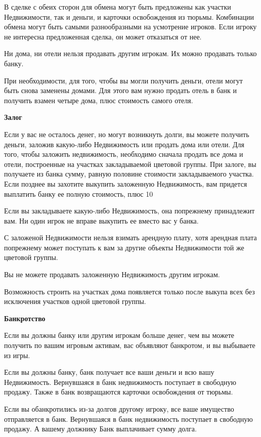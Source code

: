 В сделке с обеих сторон для обмена могут быть предложены как участки Недвижимости, так и деньги, и карточки освобождения из тюрьмы. Комбинации обмена могут быть самыми разнообразными на усмотрение игроков. Если игроку не интересна предложенная сделка, он может отказаться от нее.

Ни дома, ни отели нельзя продавать другим игрокам. Их можно продавать только банку. 

При необходимости, для того, чтобы вы могли получить деньги, отели могут быть снова заменены домами. Для этого вам нужно продать отель в банк и получить взамен четыре дома, плюс стоимость самого отеля.

{\bf Залог}

Если у вас не осталось денег, но могут возникнуть долги, вы можете получить деньги, заложив какую-либо Недвижимость или продать дома или отели. Для того, чтобы заложить недвижимость, необходимо сначала продать все дома и отели, построенные на участках закладываемой цветовой группы. При залоге, вы получаете из банка сумму, равную половине стоимости закладываемого участка. Если позднее вы захотите выкупить заложенную Недвижимость, вам придется выплатить банку ее полную стоимость, плюс 10%

Если вы закладываете какую-либо Недвижимость, она попрежнему принадлежит вам. Ни один игрок не вправе выкупить ее вместо вас у банка.

С заложеной Недвижимости нельзя взимать арендную плату, хотя арендная плата попрежнему может поступать к вам за другие объекты Недвижимости той же цветовой группы.

Вы не можете продавать заложенную Недвижимость другим игрокам.

Возможность строить на участках дома появляется только после выкупа всех без исключения участков одной цветовой группы.

{\bf Банкротство}

Если вы должны банку или другим игрокам больше денег, чем вы можете получить по вашим игровым активам, вас объявляют банкротом, и вы выбываете из игры.

Если вы должны банку, банк получает все ваши деньги и всю вашу Недвижимость. Вернувшаяся в банк недвижимость поступает в свободную продажу. Также в банк возвращаются карточки освобождения от тюрьмы.

Если вы обанкротились из-за долгов другому игроку, все ваше имущество отправляется в банк. Вернувшаяся в банк недвижимость поступает в свободную продажу. А вашему должнику Банк выплачивает сумму долга.


